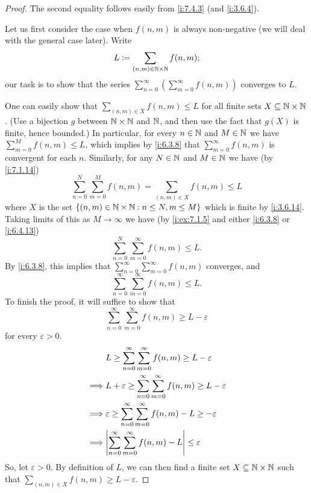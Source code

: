 \begin{proof}
  The second equality follows easily from \cref{i:7.4.3} (and \cref{i:3.6.4}).

  Let us first consider the case when \(f(n, m)\) is always non-negative (we will deal with the general case later).
  Write
  \[
    L \coloneqq \sum_{(n, m) \in \mathbb{N} \times \mathbb{N}} f(n, m);
  \]
  our task is to show that the series \(\sum_{n = 0}^\infty (\sum_{m = 0}^\infty f(n, m))\) converges to \(L\).

  One can easily show that \(\sum_{(n, m) \in X} f(n, m) \leq L\) for all finite sets \(X \subseteq \mathbb{N} \times \mathbb{N}\).
  (Use a bijection \(g\) between \(\mathbb{N} \times \mathbb{N}\) and \(\mathbb{N}\), and then use the fact that \(g(X)\) is finite, hence bounded.)
  In particular, for every \(n \in \mathbb{N}\) and \(M \in \mathbb{N}\) we have \(\sum_{m = 0}^M f(n, m) \leq L\), which implies by \cref{i:6.3.8} that \(\sum_{m = 0}^\infty f(n, m)\) is convergent for each \(n\).
  Similarly, for any \(N \in \mathbb{N}\) and \(M \in \mathbb{N}\) we have (by \cref{i:7.1.14})
  \[
    \sum_{n = 0}^N \sum_{m = 0}^M f(n, m) = \sum_{(n, m) \in X} f(n, m) \leq L
  \]
  where \(X\) is the set \(\left\lbrace(n,m) \in \mathbb{N} \times \mathbb{N} : n \leq N, m \leq M\right\rbrace\) which is finite by \cref{i:3.6.14}.
  Taking limits of this as \(M \to \infty\) we have (by \cref{i:ex:7.1.5} and either \cref{i:6.3.8} or \cref{i:6.4.13})
  \[
    \sum_{n = 0}^N \sum_{m = 0}^\infty f(n, m) \leq L.
  \]
  By \cref{i:6.3.8}, this implies that \(\sum_{n = 0}^\infty \sum_{m = 0}^\infty f(n, m)\) converges, and
  \[
    \sum_{n = 0}^\infty \sum_{m = 0}^\infty f(n, m) \leq L.
  \]
  To finish the proof, it will suffice to show that
  \[
    \sum_{n = 0}^\infty \sum_{m = 0}^\infty f(n, m) \geq L - \varepsilon
  \]
  for every \(\varepsilon > 0\).
  \begin{align*}
             & L \geq \sum_{n = 0}^\infty \sum_{m = 0}^\infty f(n, m) \geq L - \varepsilon               \\
    \implies & L + \varepsilon \geq \sum_{n = 0}^\infty \sum_{m = 0}^\infty f(n, m) \geq L - \varepsilon \\
    \implies & \varepsilon \geq \sum_{n = 0}^\infty \sum_{m = 0}^\infty f(n, m) - L \geq -\varepsilon    \\
    \implies & \abs{\sum_{n = 0}^\infty \sum_{m = 0}^\infty f(n, m) - L} \leq \varepsilon                \\
  \end{align*}
  So, let \(\varepsilon > 0\).
  By definition of \(L\), we can then find a finite set \(X \subseteq \mathbb{N} \times \mathbb{N}\) such that \(\sum_{(n, m) \in X} f(n, m) \geq L - \varepsilon\).

\end{proof}
